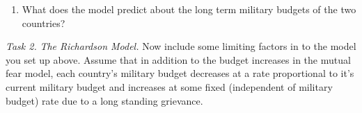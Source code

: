 \begin{enumerate}[label=\emph{(\alph*)}]
\item What does the model predict about the long term military budgets of the two countries? 


\end{enumerate}

\vfill

\emph{Task 2.} \emph{The Richardson Model.} 
Now include some limiting factors in to the model you set up above. Assume that in addition to the budget increases in the mutual fear model, each country's military budget decreases at a rate proportional to it's current military budget and increases at some fixed (independent of military budget) rate due to a long standing grievance.

